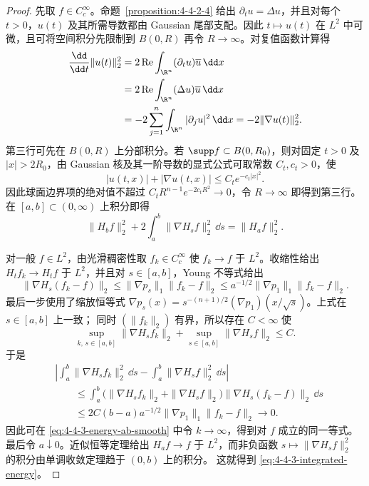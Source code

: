\begin{proof}
先取 $f\in C_c^\infty$。命题~\ref{proposition:4-4-2-4} 给出
$\partial_tu=\Delta u$，并且对每个 $t>0$，$u(t)$ 及其所需导数都由 Gaussian
尾部支配。因此 $t\mapsto u(t)$ 在 $L^2$ 中可微，且可将空间积分先限制到
$B(0,R)$ 再令 $R\to\infty$。对复值函数计算得
\begin{align*}
 \frac{\dd}{\dd t}\|u(t)\|_2^2
 &=2\operatorname{Re}\int_{\R^n}(\partial_tu)\overline u\,\dd x\\
 &=2\operatorname{Re}\int_{\R^n}(\Delta u)\overline u\,\dd x\\
 &=-2\sum_{j=1}^n\int_{\R^n}|\partial_ju|^2\,\dd x
 =-2\|\nabla u(t)\|_2^2.
\end{align*}
第三行可先在 $B(0,R)$ 上分部积分。若 $\supp f\subset B(0,R_0)$，则对固定 $t>0$ 及
$|x|>2R_0$，由 Gaussian 核及其一阶导数的显式公式可取常数 $C_t,c_t>0$，使
\[
 |u(t,x)|+|\nabla u(t,x)|\leq C_te^{-c_t|x|^2}.
\]
因此球面边界项的绝对值不超过
$C_tR^{n-1}e^{-2c_tR^2}\to0$，令 $R\to\infty$ 即得到第三行。
在 $[a,b]\subset(0,\infty)$ 上积分即得
\begin{equation}\label{eq:4-4-3-energy-ab-smooth}
 \|H_bf\|_2^2+2\int_a^b\|\nabla H_sf\|_2^2\,\dd s
 =\|H_af\|_2^2.
\end{equation}

对一般 $f\in L^2$，由光滑稠密性取 $f_k\in C_c^\infty$ 使
$f_k\to f$ 于 $L^2$。收缩性给出
$H_tf_k\to H_tf$ 于 $L^2$，并且对 $s\in[a,b]$，Young 不等式给出
\[
 \|\nabla H_s(f_k-f)\|_2
 \le\|\nabla p_s\|_1\|f_k-f\|_2
 \le a^{-1/2}\|\nabla p_1\|_1\|f_k-f\|_2.
\]
最后一步使用了缩放恒等式
$\nabla p_s(x)=s^{-(n+1)/2}(\nabla p_1)(x/\sqrt s)$。上式在 $s\in[a,b]$ 上一致；
同时 $(\|f_k\|_2)$ 有界，所以存在 $C<\infty$ 使
\[
 \sup_{k,\,s\in[a,b]}\|\nabla H_sf_k\|_2
 +\sup_{s\in[a,b]}\|\nabla H_sf\|_2\le C.
\]
于是
\begin{align*}
 &\left|\int_a^b\|\nabla H_sf_k\|_2^2\,\dd s
 -\int_a^b\|\nabla H_sf\|_2^2\,\dd s\right|\\
 &\qquad\le
 \int_a^b\bigl(\|\nabla H_sf_k\|_2+\|\nabla H_sf\|_2\bigr)
 \|\nabla H_s(f_k-f)\|_2\,\dd s\\
 &\qquad\le 2C(b-a)a^{-1/2}\|\nabla p_1\|_1\|f_k-f\|_2
 \longrightarrow0.
\end{align*}
因此可在 \eqref{eq:4-4-3-energy-ab-smooth} 中令 $k\to\infty$，得到对 $f$ 成立的同一等式。
最后令 $a\downarrow0$。近似恒等定理给出 $H_af\to f$ 于 $L^2$，而非负函数
$s\mapsto\|\nabla H_sf\|_2^2$ 的积分由单调收敛定理趋于 $(0,b)$ 上的积分。
这就得到 \eqref{eq:4-4-3-integrated-energy}。
\end{proof}

